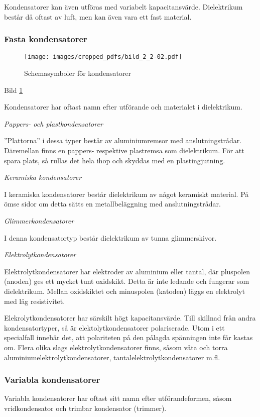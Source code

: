 Kondensatorer kan även utföras med variabelt kapacitansvärde.
Dielektrikum består då oftast av luft, men kan även vara ett fast material.

\subsubsection{Fasta kondensatorer}

\begin{figure}[ht]
\texttt{[image: images/cropped\_pdfs/bild\_2\_2-02.pdf]}
\caption{Schemasymboler för kondensatorer}
\label{fig:BildII2-2}
\end{figure}

Bild \ref{fig:BildII2-2}

Kondensatorer har oftast namn efter utförande och materialet i dielektrikum.

\emph{Pappers- och plastkondensatorer}

''Plattorna'' i dessa typer består av aluminiumremsor med anslutningstrådar.
Däremellan finns en pappers- respektive plastremsa som dielektrikum. För att
spara plats, så rullas det hela ihop och skyddas med en plastingjutning.

\emph{Keramiska kondensatorer}

I keramiska kondensatorer består dielektrikum av något keramiskt material.
På ömse sidor om detta sätts en metallbeläggning med anslutningstrådar.

\emph{Glimmerkondensatorer}

I denna kondensatortyp består dielektrikum av tunna glimmerskivor.

\emph{Elektrolytkondensatorer}

Elektrolytkondensatorer har elektroder av aluminium eller tantal, där pluspolen
(anoden) ges ett mycket tunt oxidskikt. Detta är inte ledande och fungerar som
dielektrikum. Mellan oxidskiktet och minuspolen (katoden) läggs en elektrolyt
med låg resistivitet.

Elekrolytkondensatorer har särskilt högt kapacitansvärde. Till skillnad från
andra kondensatortyper, så är elektolytkondensatorer polariserade. Utom i ett
specialfall innebär det, att polariteten på den pålagda spänningen inte får
kastas om. Flera olika slags elektrolytkondensatorer finns, såsom våta
och torra aluminiumelektrolytkondensatorer, tantalelektrolytkondensatorer m.fl.

\subsubsection{Variabla kondensatorer}
Variabla kondensatorer har oftast sitt namn efter utförandeformen, såsom
vridkondensator och trimbar kondensator (trimmer).

